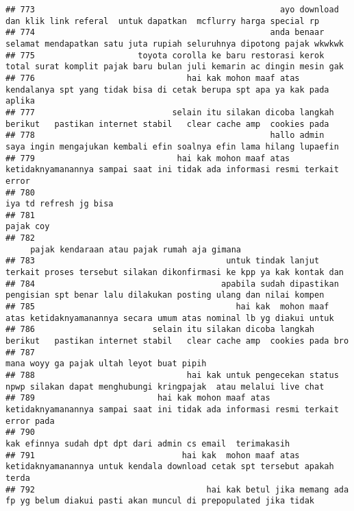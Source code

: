 \documentclass[
]{article}
\begin{document}
\begin{verbatim}
## 773                                                  ayo download dan klik link referal  untuk dapatkan  mcflurry harga special rp  
## 774                                                anda benaar selamat mendapatkan satu juta rupiah seluruhnya dipotong pajak wkwkwk
## 775                     toyota corolla ke baru restorasi kerok total surat komplit pajak baru bulan juli kemarin ac dingin mesin gak
## 776                               hai kak mohon maaf atas kendalanya spt yang tidak bisa di cetak berupa spt apa ya kak pada aplika 
## 777                            selain itu silakan dicoba langkah berikut   pastikan internet stabil   clear cache amp  cookies pada 
## 778                                                hallo admin  saya ingin mengajukan kembali efin soalnya efin lama hilang lupaefin
## 779                             hai kak mohon maaf atas ketidaknyamanannya sampai saat ini tidak ada informasi resmi terkait error  
## 780                                                                                                           iya td refresh jg bisa
## 781                                                                                                                        pajak coy
## 782                                                                                 ᅠ ᅠ pajak kendaraan atau pajak rumah aja gimana  ᅠ ᅠ
## 783                                       untuk tindak lanjut terkait proses tersebut silakan dikonfirmasi ke kpp ya kak kontak dan 
## 784                                      apabila sudah dipastikan pengisian spt benar lalu dilakukan posting ulang dan nilai kompen 
## 785                                         hai kak  mohon maaf atas ketidaknyamanannya secara umum atas nominal lb yg diakui untuk 
## 786                        selain itu silakan dicoba langkah berikut   pastikan internet stabil   clear cache amp  cookies pada bro 
## 787                                                                                        mana woyy ga pajak ultah leyot buat pipih
## 788                               hai kak untuk pengecekan status npwp silakan dapat menghubungi kringpajak  atau melalui live chat 
## 789                         hai kak mohon maaf atas ketidaknyamanannya sampai saat ini tidak ada informasi resmi terkait error pada 
## 790                                                                       kak efinnya sudah dpt dpt dari admin cs email  terimakasih
## 791                              hai kak  mohon maaf atas ketidaknyamanannya untuk kendala download cetak spt tersebut apakah terda 
## 792                                   hai kak betul jika memang ada fp yg belum diakui pasti akan muncul di prepopulated jika tidak 

\end{verbatim}
\end{document}
